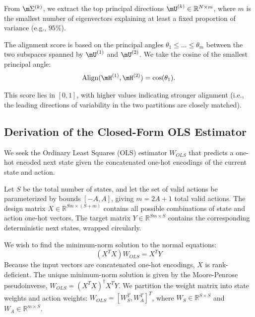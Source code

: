 \documentclass{article}
\begin{document}
From $\m\Sigma^{(k)}$, we extract the top principal directions $\mU^{(k)} \in \mathbb{R}^{N \times m}$, where $m$ is the smallest number of eigenvectors explaining at least a fixed proportion of variance (e.g., $95\%$).

The alignment score is based on the principal angles $\theta_1 \leq \dots \leq \theta_m$ between the two subspaces spanned by $\mU^{(1)}$ and $\mU^{(2)}$. We take the cosine of the smallest principal angle:
\[
\mathrm{Align}(\mH^{(1)}, \mH^{(2)}) = \cos(\theta_1).
\]

\noindent
This score lies in $[0,1]$, with higher values indicating stronger alignment (i.e., the leading directions of variability in the two partitions are closely matched). 

\subsection{Derivation of the Closed-Form OLS Estimator}
\label{sec:ols_derivation}

We seek the Ordinary Least Squares (OLS) estimator $W_{OLS}$ that predicts a one-hot encoded next state given the concatenated one-hot encodings of the current state and action. 

Let $S$ be the total number of states, and let the set of valid actions be parameterized by bounds $[-A, A]$, giving $m = 2A+1$ total valid actions. The design matrix $X \in \mathbb{R}^{Sm \times (S+m)}$ contains all possible combinations of state and action one-hot vectors. The target matrix $Y \in \mathbb{R}^{Sm \times S}$ contains the corresponding deterministic next states, wrapped circularly.

We wish to find the minimum-norm solution to the normal equations:
\begin{equation}
    (X^T X) W_{OLS} = X^T Y
\end{equation}
Because the input vectors are concatenated one-hot encodings, $X$ is rank-deficient. The unique minimum-norm solution is given by the Moore-Penrose pseudoinverse, $W_{OLS} = (X^T X)^\dagger X^T Y$. We partition the weight matrix into state weights and action weights: $W_{OLS} = [W_S^T, W_A^T]^T$, where $W_S \in \mathbb{R}^{S \times S}$ and $W_A \in \mathbb{R}^{m \times S}$.
\end{document}
